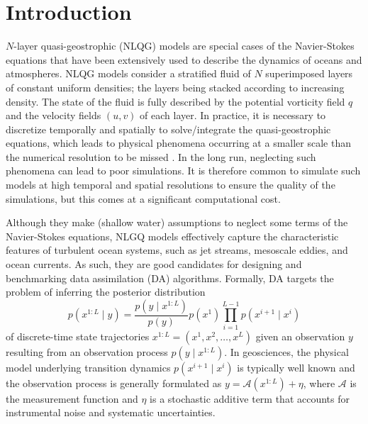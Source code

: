 \section{Introduction}

$N$-layer quasi-geostrophic (NLQG) models \cite{cotter2020data} are special cases of the Navier-Stokes equations that have been extensively used to describe the dynamics of oceans and atmospheres. NLQG models consider a stratified fluid of $N$ superimposed layers of constant uniform densities; the layers being stacked according to increasing density. The state of the fluid is fully described by the potential vorticity field $q$ and the velocity fields $(u, v)$ of each layer. In practice, it is necessary to discretize temporally and spatially to solve/integrate the quasi-geostrophic equations, which leads to physical phenomena occurring at a smaller scale than the numerical resolution to be missed \cite{cotter2020data, bolton2019applications, ross2023benchmarking, mangeleer2023ocean}. In the long run, neglecting such phenomena can lead to poor simulations. It is therefore common to simulate such models at high temporal and spatial resolutions to ensure the quality of the simulations, but this comes at a significant computational cost.

Although they make (shallow water) assumptions to neglect some terms of the Navier-Stokes equations, NLGQ models effectively capture the characteristic features of turbulent ocean systems, such as jet streams, mesoscale eddies, and ocean currents. As such, they are good candidates for designing and benchmarking data assimilation (DA) \cite{lorenc1986analysis, ledimet1986variational, tremolet2006accounting, tremolet2007modelerror, fisher2011weakconstraint, carrassi2018data, ecmwf2020ifs} algorithms. Formally, DA targets the problem of inferring the posterior distribution
\begin{equation}
    p(x^{1:L} \mid y) = \frac{p(y \mid x^{1:L})}{p(y)} p(x^1) \prod_{i = 1}^{L - 1} p(x^{i+1} \mid x^i)
\end{equation}
of discrete-time state trajectories $x^{1:L} = (x^1, x^2, \dots, x^L)$ given an observation $y$ resulting from an observation process $p(y \mid x^{1:L})$. In geosciences, the physical model underlying transition dynamics $p(x^{i+1} \mid x^i)$ is typically well known and the observation process is generally formulated as $y = \mathcal{A}(x^{1:L}) + \eta$, where $\mathcal{A}$ is the measurement function and $\eta$ is a stochastic additive term that accounts for instrumental noise and systematic uncertainties.

